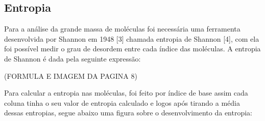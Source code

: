 \subsection{Entropia}

Para a análise da grande massa de moléculas foi necessária uma ferramenta
desenvolvida por Shannon em 1948 [3] chamada entropia de Shannon [4], com ela foi
possível medir o grau de desordem entre cada índice das moléculas. A entropia de
Shannon é dada pela seguinte expressão:

(FORMULA E IMAGEM DA PAGINA 8)

Para calcular a entropia nas moléculas, foi feito por índice de base assim cada
coluna tinha o seu valor de entropia calculado e logos após tirando a média dessas
entropias, segue abaixo uma figura sobre o desenvolvimento da entropia:
